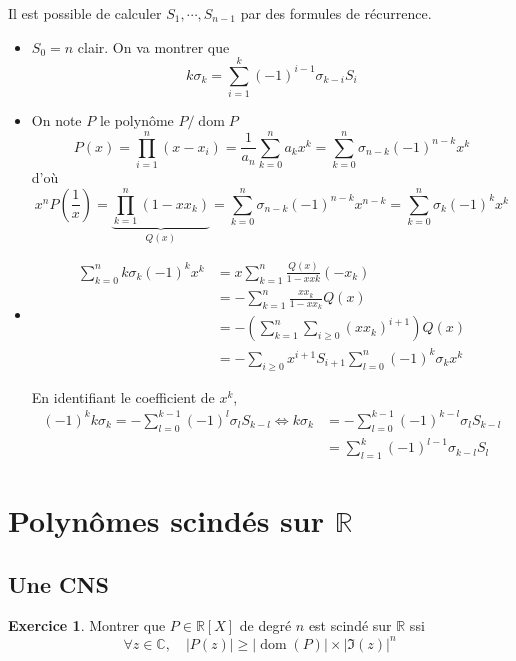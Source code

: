 \documentclass{article}
\theoremstyle{definition}
\newtheorem*{exo}{Exercice}
\DeclareMathOperator{\dom}{dom}
\begin{document}
Il est possible de calculer $S_1, \cdots, S_{n-1}$ par des formules de récurrence. \begin{itemize}
    \item $S_0=n$ clair. On va montrer que \[
            k\sigma_k=\sum_{i=1}^k(-1)^{i-1}\sigma_{k-i}S_i
        \]
    \item On note $P$ le polynôme $P/\dom P$\[
            P(x)=\prod_{i=1}^n(x-x_i)=\frac1{a_n}\sum_{k=0}^na_kx^k=\sum_{k=0}^n\sigma_{n-k}(-1)^{n-k}x^k
        \]
        d'où \[
            x^nP\left(\frac1x\right)=\underbrace{\prod_{k=1}^n(1-xx_k)}_{Q(x)}=\sum_{k=0}^n\sigma_{n-k}(-1)^{n-k}x^{n-k}=\sum_{k=0}^n\sigma_k(-1)^kx^k
        \]
    \item \begin{align*}
            \sum_{k=0}^n k\sigma_k(-1)^kx^k&= x\sum_{k=1}^n \frac{Q(x)}{1-xxk}(-x_k) \\
                                           &=-\sum_{k=1}^n\frac{xx_k}{1-xx_k}Q(x) \\
                                           &=-\left(\sum_{k=1}^n\sum_{i\geq 0}(xx_k)^{i+1}\right)Q(x) \\
                                           &=-\sum_{i\geq 0}x^{i+1}S_{i+1}\sum_{l=0}^n(-1)^k\sigma_kx^k
        \end{align*}

        En identifiant le coefficient de $x^k$, \begin{align*}
            (-1)^kk\sigma_k=-\sum_{l=0}^{k-1}(-1)^l\sigma_lS_{k-l} \iff k\sigma_k &=-\sum_{l=0}^{k-1}(-1)^{k-l}\sigma_lS_{k-l} \\
                                                                                  & =\sum_{l=1}^k(-1)^{l-1}\sigma_{k-l}S_l
        \end{align*}
\end{itemize}

\section{Polynômes scindés sur $\mathbb R$}

\subsection{Une CNS}

\begin{exo}
    Montrer que $P\in\mathbb R[X]$ de degré $n$ est scindé sur $\mathbb R$ ssi \[
        \forall z\in\mathbb C, \quad |P(z)|\geq |\dom(P)|\times |\Im(z)|^n
    \]
\end{exo}
\end{document}
